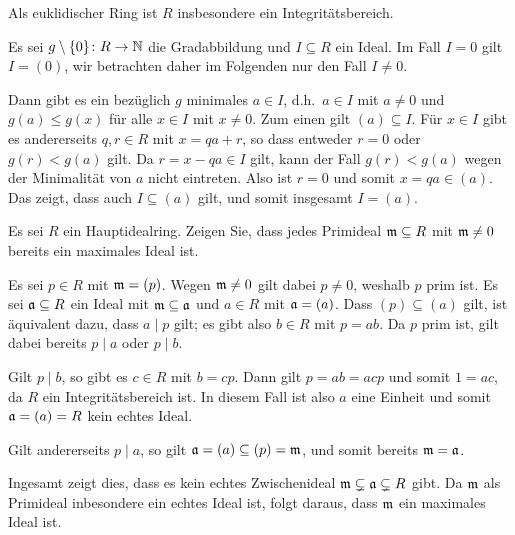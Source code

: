 \begin{solution}
  Als euklidischer Ring ist $R$ insbesondere ein Integritätsbereich.
  
  Es sei $g \setminus \{0\} \colon R \to \mathbb{N}$ die Gradabbildung und $I \subseteq R$ ein Ideal.
  Im Fall $I = 0$ gilt $I = (0)$, wir betrachten daher im Folgenden nur den Fall $I \neq 0$.
  
  Dann gibt es ein bezüglich $g$ minimales $a \in I$, d.h.\ $a \in I$ mit $a \neq 0$ und $g(a) \leq g(x)$ für alle $x \in I$ mit $x \neq 0$.
  Zum einen gilt $(a) \subseteq I$.
  Für $x \in I$ gibt es andererseits $q, r \in R$ mit $x = qa + r$, so dass entweder $r = 0$ oder $g(r) < g(a)$ gilt.
  Da $r = x - qa \in I$ gilt, kann der Fall $g(r) < g(a)$ wegen der Minimalität von $a$ nicht eintreten.
  Also ist $r = 0$ und somit $x = qa \in (a)$.
  Das zeigt, dass auch $I \subseteq (a)$ gilt, und somit insgesamt $I = (a)$.
\end{solution}


\begin{question}[subtitle = Primideale in Hauptidearingen]
  Es sei $R$ ein Hauptidealring.
  Zeigen Sie, dass jedes Primideal $\mathfrak{m} \subseteq R$ mit $\mathfrak{m} \neq 0$ bereits ein maximales Ideal ist.
\end{question}


\begin{solution}
  Es sei $p \in R$ mit $\mathfrak{m} = (p)$.
  Wegen $\mathfrak{m} \neq 0$ gilt dabei $p \neq 0$, weshalb $p$ prim ist.
  Es sei $\mathfrak{a} \subseteq R$ ein Ideal mit $\mathfrak{m} \subseteq \mathfrak{a}$ und $a \in R$ mit $\mathfrak{a} = (a)$.
  Dass $(p) \subseteq (a)$ gilt, ist äquivalent dazu, dass $a \mid p$ gilt;
  es gibt also $b \in R$ mit $p = ab$.
  Da $p$ prim ist, gilt dabei bereits $p \mid a$ oder $p \mid b$.
  
  Gilt $p \mid b$, so gibt es $c \in R$ mit $b = cp$.
  Dann gilt $p = ab = acp$ und somit $1 = ac$, da $R$ ein Integritätsbereich ist.
  In diesem Fall ist also $a$ eine Einheit und somit $\mathfrak{a} = (a) = R$ kein echtes Ideal.
  
  Gilt andererseits $p \mid a$, so gilt $\mathfrak{a} = (a) \subseteq (p) = \mathfrak{m}$, und somit bereits $\mathfrak{m} = \mathfrak{a}$.
  
  Ingesamt zeigt dies, dass es kein echtes Zwischenideal $\mathfrak{m} \subsetneq \mathfrak{a} \subsetneq R$ gibt.
  Da $\mathfrak{m}$ als Primideal inbesondere ein echtes Ideal ist, folgt daraus, dass $\mathfrak{m}$ ein maximales Ideal ist.
\end{solution}


